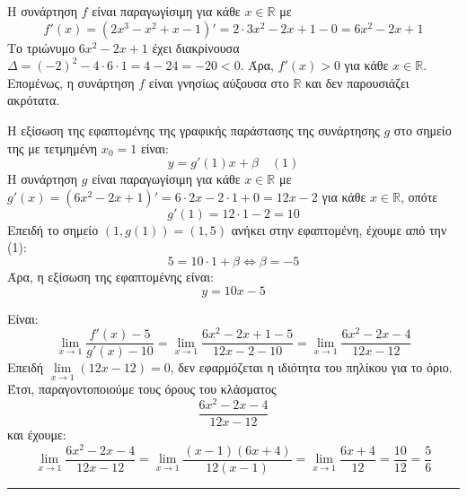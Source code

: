 \begin{alist}
    \item Η συνάρτηση $f$ είναι παραγωγίσιμη για κάθε $x \in \mathbb{R}$ με
    \[ f'(x) = (2x^3 - x^2 + x - 1)' = 2 \cdot 3x^2 - 2x + 1 - 0 = 6x^2 - 2x + 1 \]
    Το τριώνυμο $6x^2 - 2x + 1$ έχει διακρίνουσα $\Delta = (-2)^2 - 4 \cdot 6 \cdot 1 = 4 - 24 = -20 < 0$.
    Άρα, $f'(x) > 0$ για κάθε $x \in \mathbb{R}$.
    Επομένως, η συνάρτηση $f$ είναι γνησίως αύξουσα στο $\mathbb{R}$ και δεν παρουσιάζει ακρότατα.
    
    \item Η εξίσωση της εφαπτομένης της γραφικής παράστασης της συνάρτησης $g$ στο σημείο της με τετμημένη $x_0 = 1$ είναι:
    \[ y = g'(1)x + \beta \quad (1) \]
    Η συνάρτηση $g$ είναι παραγωγίσιμη για κάθε $x \in \mathbb{R}$ με
    $g'(x) = (6x^2 - 2x + 1)' = 6 \cdot 2x - 2 \cdot 1 + 0 = 12x - 2$ για κάθε $x \in \mathbb{R}$, οπότε
    \[ g'(1) = 12 \cdot 1 - 2 = 10 \]
    Επειδή το σημείο $(1, g(1)) = (1,5)$ ανήκει στην εφαπτομένη, έχουμε από την (1):
    \[ 5 = 10 \cdot 1 + \beta \Leftrightarrow \beta = -5 \]
    Άρα, η εξίσωση της εφαπτομένης είναι:
    \[ y = 10x - 5 \]
    
    \item Είναι:
    \[ \lim\limits_{x \to 1} \frac{f'(x) - 5}{g'(x) - 10} = \lim\limits_{x \to 1} \frac{6x^2 - 2x + 1 - 5}{12x - 2 - 10} = \lim\limits_{x \to 1} \frac{6x^2 - 2x - 4}{12x - 12} \]
    Επειδή $\lim\limits_{x \to 1}(12x - 12) = 0$, δεν εφαρμόζεται η ιδιότητα του πηλίκου για το όριο.
    Έτσι, παραγοντοποιούμε τους όρους του κλάσματος
    \[ \frac{6x^2 - 2x - 4}{12x - 12} \]
    και έχουμε:
    \[ \lim\limits_{x \to 1} \frac{6x^2 - 2x - 4}{12x - 12} = \lim\limits_{x \to 1} \frac{(x - 1)(6x + 4)}{12(x - 1)} = \lim\limits_{x \to 1} \frac{6x + 4}{12} = \frac{10}{12} = \frac{5}{6} \]
\end{alist}
\vspace{6mm}
\noindent\rule{\textwidth}{0.4pt}
\vspace{6mm}

